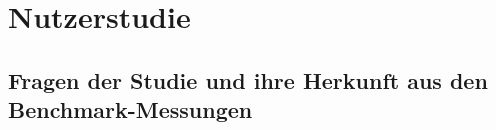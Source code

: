 \chapter{Nutzerstudie}
\label{chap:nutzerstudie}

\section{Fragen der Studie und ihre Herkunft aus den Benchmark-Messungen}%
\label{sec:studienfragen}
%
%
